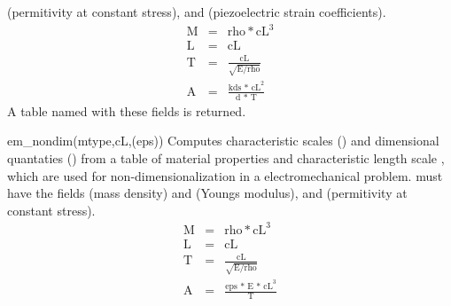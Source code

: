 \begin{codelist}
    (permitivity at constant stress), 
    and (piezoelectric strain coefficients).
    \begin{eqnarray}
      \text{M} &=& \text{rho} * \text{cL}^3 \nonumber \\ 
      \text{L} &=& \text{cL}                \nonumber \\
      \text{T} &=& \frac{\text{cL}}{\sqrt{\text{E/rho}}} \nonumber \\
      \text{A} &=& \frac{\text{kds * cL}^2}{\text{d * T}} \nonumber 
    \end{eqnarray}
    A table named  with these fields is returned.
  \item[em\_nondim(mtype,cL,(eps))] 
    Computes characteristic scales () and dimensional 
    quantaties () from a 
    table of material properties  and characteristic length
    scale , which are used for non-dimensionalization in a 
    electromechanical problem.  must have the fields 
    (mass density) and  (Youngs modulus),
    and (permitivity at constant stress).
    \begin{eqnarray}
      \text{M} &=& \text{rho} * \text{cL}^3 \nonumber \\ 
      \text{L} &=& \text{cL}                \nonumber \\
      \text{T} &=& \frac{\text{cL}}{\sqrt{\text{E/rho}}} \nonumber \\
      \text{A} &=& \frac{\text{eps * E * cL}^3}{\text{T}} \nonumber
    \end{eqnarray}
\end{codelist}

